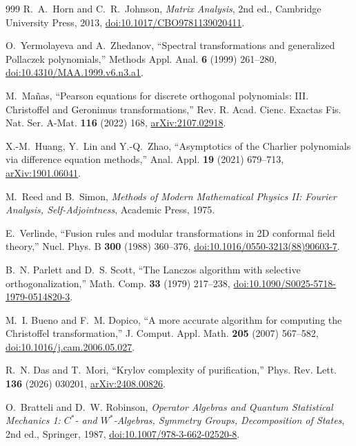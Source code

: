 \documentclass[a4paper,11pt]{article}
\theoremstyle{definition}
\theoremstyle{remark}
\begin{document}
\begin{thebibliography}{999}
R.~A.~Horn and C.~R.~Johnson,
\emph{Matrix Analysis}, 2nd ed.,
Cambridge University Press, 2013,
\href{https://doi.org/10.1017/CBO9781139020411}{doi:10.1017/CBO9781139020411}.

O.~Yermolayeva and A.~Zhedanov,
``Spectral transformations and generalized Pollaczek polynomials,''
Methods Appl. Anal. \textbf{6} (1999) 261--280,
\href{https://doi.org/10.4310/MAA.1999.v6.n3.a1}{doi:10.4310/MAA.1999.v6.n3.a1}.

M.~Ma\~nas,
``Pearson equations for discrete orthogonal polynomials: III. Christoffel and Geronimus transformations,''
Rev. R. Acad. Cienc. Exactas Fis. Nat. Ser. A-Mat. \textbf{116} (2022) 168,
\href{https://arxiv.org/abs/2107.02918}{arXiv:2107.02918}.

X.-M.~Huang, Y.~Lin and Y.-Q.~Zhao,
``Asymptotics of the Charlier polynomials via difference equation methods,''
Anal. Appl. \textbf{19} (2021) 679--713,
\href{https://arxiv.org/abs/1901.06041}{arXiv:1901.06041}.

M.~Reed and B.~Simon,
\emph{Methods of Modern Mathematical Physics II: Fourier Analysis, Self-Adjointness},
Academic Press, 1975.

E.~Verlinde,
``Fusion rules and modular transformations in 2D conformal field theory,''
Nucl. Phys. B \textbf{300} (1988) 360--376,
\href{https://doi.org/10.1016/0550-3213(88)90603-7}{doi:10.1016/0550-3213(88)90603-7}.

B.~N. Parlett and D.~S. Scott, ``The Lanczos algorithm with selective orthogonalization,'' Math. Comp. \textbf{33} (1979) 217--238,
\href{https://doi.org/10.1090/S0025-5718-1979-0514820-3}{doi:10.1090/S0025-5718-1979-0514820-3}.

M.~I. Bueno and F.~M. Dopico,
``A more accurate algorithm for computing the Christoffel transformation,''
J. Comput. Appl. Math. \textbf{205} (2007) 567--582,
\href{https://doi.org/10.1016/j.cam.2006.05.027}{doi:10.1016/j.cam.2006.05.027}.

R.~N. Das and T.~Mori,
``Krylov complexity of purification,''
 Phys. Rev. Lett. \textbf{136} (2026) 030201,
\href{https://arxiv.org/abs/2408.00826}{arXiv:2408.00826}.

O.~Bratteli and D.~W. Robinson,
\emph{Operator Algebras and Quantum Statistical Mechanics 1:
\(C^*\)- and \(W^*\)-Algebras, Symmetry Groups, Decomposition of States},
2nd ed., Springer, 1987,
\href{https://doi.org/10.1007/978-3-662-02520-8}{doi:10.1007/978-3-662-02520-8}.


\end{thebibliography}
\end{document}
